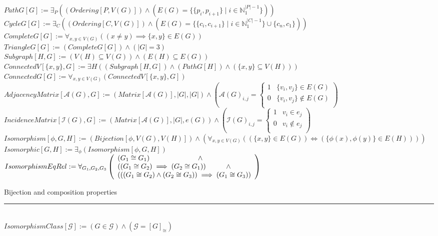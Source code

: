 \documentclass{book}
\newcommand{\abr}{:=}
\newcommand{\pr}[1]{\left(#1\right)}
\newcommand{\st}{\mathbin{|}}
\newcommand{\utup}[1]{\{#1\}}
\begin{document}
$PathG[G] \abr \exists_{P}((Ordering[P, V(G)]) \land (E(G) = \{\utup{p_i, p_{i + 1}} \st i \in \mathbb{N}_1^{|P| - 1}\}))$ \\
$CycleG[G] \abr \exists_{C}((Ordering[C, V(G)]) \land (E(G) = \{\utup{c_i, c_{i + 1}} \st i \in \mathbb{N}_1^{|C| - 1}\} \cup \{c_n, c_1\}))$ \\
$CompleteG[G] \abr \forall_{x, y \in V(G)}((x \neq y) \implies \utup{x, y} \in E(G))$ \\
$TriangleG[G] \abr (CompleteG[G]) \land (|G| = 3)$ \\

$Subgraph[H, G] \abr (V(H) \subseteq V(G)) \land (E(H) \subseteq E(G))$ \\
$ConnectedV[\{x, y\}, G] \abr \exists{H}((Subgraph[H, G]) \land (PathG[H]) \land (\{x, y\} \subseteq V(H)))$ \\
$ConnectedG[G] \abr \forall_{x, y \in V(G)}(ConnectedV[\{x, y\}, G])$ \\

$AdjacencyMatrix[\mathcal{A}(G), G] \abr (Matrix[\mathcal{A}(G)], |G|, |G|) \land \pr{\mathcal{A}(G)_{i, j} = 
\begin{cases} 
  1 & \utup{v_i, v_j} \in E(G) \\
  0 & \utup{v_i, v_j} \notin E(G) \\
\end{cases}}$ \\

$IncidenceMatrix[\mathcal{I}(G), G] \abr (Matrix[\mathcal{A}(G)], |G|, e(G)) \land \pr{\mathcal{I}(G)_{i, j} = 
\begin{cases} 
  1 & v_i \in e_j \\
  0 & v_i \notin e_j \\
\end{cases}}$ \\

$Isomorphism[\phi, G, H] \abr (Bijection[\phi, V(G), V(H)]) \land (\forall_{x, y \in V(G)}((\utup{x, y} \in E(G)) \iff (\utup{\phi(x), \phi(y)} \in E(H))))$ \\
$Isomorphic[G, H] \abr \exists_{\phi}(Isomorphism[\phi, G, H])$ \\
$IsomorphismEqRel \abr \forall_{G_1, G_2, G_3}
\left(\begin{array}{ll}
  (G_1 \cong G_1) \hfill \land \hfill \\
  ((G_1 \cong G_2) \implies (G_2 \cong G_1)) \hfill \land \hfill \\
  (((G_1 \cong G_2) \land (G_2 \cong G_3)) \implies (G_1 \cong G_3)) \\
\end{array}\right)$
\begin{enumerate}
  \lit Bijection and composition properties
\end{enumerate} \vspace{.75mm} \hrule \vspace{.75mm} \ \\ 
$IsomorphismClass[\mathcal{G}] \abr (G \in \mathcal{G}) \land (\mathcal{G} = [G]_{\cong})$ \\
\end{document}
